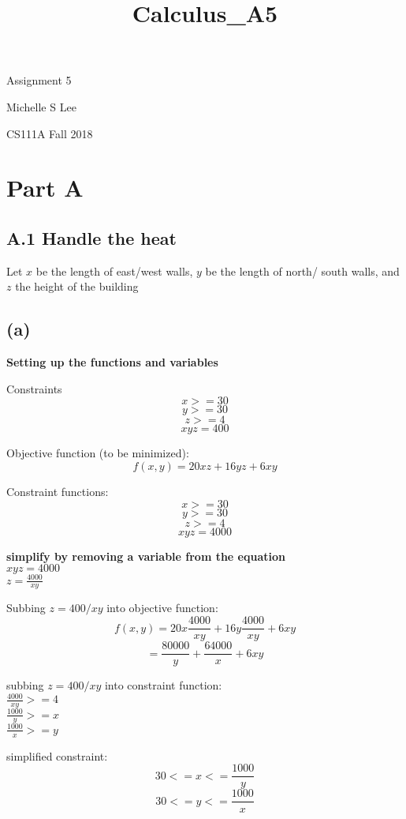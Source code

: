 \documentclass[11pt]{article}
\title{Calculus\_A5}
\begin{document}
    
    
    \maketitle
    
    

    
    Assignment 5

Michelle S Lee

CS111A Fall 2018

    \section{Part A}\label{part-a}

\subsection{A.1 Handle the heat}\label{a.1-handle-the-heat}

Let \(x\) be the length of east/west walls, \(y\) be the length of
north/ south walls, and \(z\) the height of the building

    \subsection{(a)}\label{a}

\textbf{Setting up the functions and variables}

Constraints \[x >= 30\] \[y >= 30\] \[z >= 4\] \[xyz = 400\]

Objective function (to be minimized): \[f(x,y) = 20xz + 16yz + 6xy\]

Constraint functions: \[x >= 30\] \[y >= 30\] \[z >= 4\] \[xyz = 4000\]

\textbf{simplify by removing a variable from the equation}\\
\(xyz = 4000\)\\
\(z = \frac {4000}{xy}\)

Subbing \(z = 400/xy\) into objective function:\\
\[f(x,y) = 20x\frac {4000}{xy} + 16y\frac {4000}{xy} + 6xy\]
\[= \frac {80000}{y} + \frac {64000}{x} + 6xy\]

subbing \(z = 400/xy\) into constraint function:\\
\(\frac {4000}{xy} >= 4\)\\
\(\frac {1000}{y} >= x\)\\
\(\frac {1000}{x} >= y\)

simplified constraint:\\
\[ 30 <= x <= \frac {1000}{y}\] \[30 <= y <= \frac {1000}{x}\]
\end{document}
